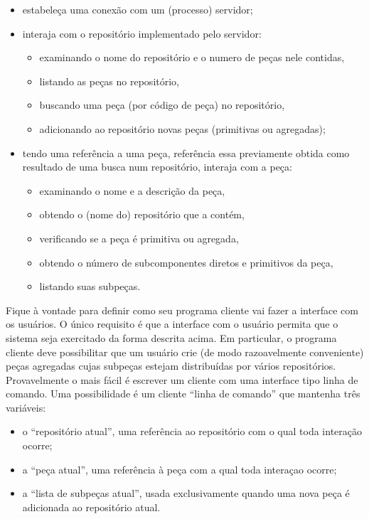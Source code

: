 \documentclass[oneside,12pt,a4paper]{memoir}
\begin{document}
\begin{itemize}
\item estabeleça uma conexão com um (processo) servidor;
\item interaja com o repositório implementado pelo servidor:
  \begin{itemize}
  \item examinando o nome do repositório e o numero de peças nele contidas,
  \item listando as peças no repositório,
  \item buscando uma peça (por código de peça) no repositório,
  \item adicionando ao repositório novas peças (primitivas ou agregadas);
  \end{itemize}
\item tendo uma referência a uma peça, referência essa previamente obtida como resultado de uma busca num repositório, interaja com a peça:
  \begin{itemize}
  \item examinando o nome e a descrição da peça,
  \item obtendo o (nome do) repositório que a contém,
  \item verificando se a peça é primitiva ou agregada,
  \item obtendo o número de subcomponentes diretos e primitivos da peça,
  \item listando suas subpeças.
  \end{itemize}
\end{itemize}

Fique à vontade para definir como seu programa cliente vai fazer a
interface com os usuários. O único requisito é que a interface com o
usuário permita que o sistema seja exercitado da forma descrita
acima. Em particular, o programa cliente deve possibilitar que um
usuário crie (de modo razoavelmente conveniente) peças agregadas cujas
subpeças estejam distribuídas por vários repositórios. Provavelmente o
mais fácil é escrever um cliente com uma interface tipo linha de
comando. Uma possibilidade é um cliente ``linha de comando'' que
mantenha três variáveis:

\begin{itemize}
\item o ``repositório atual'', uma referência ao repositório com o
  qual toda interação ocorre;
\item a ``peça atual'', uma referência à peça com a qual toda
  interaçao ocorre;
\item a ``lista de subpeças atual'', usada exclusivamente quando
  uma nova peça é adicionada ao repositório atual.
\end{itemize}
\end{document}

